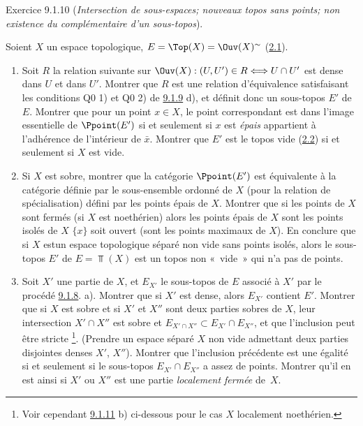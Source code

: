 \documentclass[10pt]{../fichiers-configuration-latex/smfart}
\begin{document}
\begin{enonce*}[remark]{Exercice 9.1.10}
(\emph{Intersection de sous-espaces; nouveaux topos sans points; non
existence du complémentaire d'un sous-topos}).

Soient $X$ un espace topologique, $E=\Top(X)=\Ouv(X)^{\sim}$
(\hyperref[IV.subsec2.1]{2.1}).

\begin{enumerate}
\renewcommand{\theenumi}{\alph{enumi}}
\renewcommand{\labelenumi}{\theenumi)}
\item Soit $R$ la relation suivante sur $\Ouv(X):(U,U')\in
R\Longleftrightarrow U\cap U'$ est dense dans $U$ et dans $U'$.
Montrer que $R$ est une relation d'équivalence satisfaisant les
conditions Q0 1) et Q0 2) de \hyperref[IV.exer9.1.9]{9.1.9} d), et définit donc
un sous-topos $E'$ de $E$. Montrer que pour un point $x\in X$, le
point correspondant est dans l'image essentielle de $\Ppoint(E')$ si
et seulement si $x$ est \emph{épais} \ie appartient à l'adhérence de
l'intérieur de $\bar{x}$. Montrer que $E'$ est le topos vide
(\hyperref[IV.subsec2.2]{2.2}) si et seulement si $X$ est vide.

\item Si $X$ est sobre, montrer que la catégorie $\Ppoint(E')$ est
équivalente à la catégorie définie par le sous-ensemble ordonné de
$X$ (pour la relation de spécialisation) défini par les points épais
de $X$. Montrer que si les points de $X$ sont fermés (\resp si $X$
est noethérien) alors les points épais de $X$ sont les points isolés
de $X$  $\{x\}$ soit ouvert (\resp sont les points
maximaux de $X$). En conclure que si $X$ est\pageoriginale un espace
topologique séparé non vide sans points isolés, alors le sous-topos
$E'$ de $E=\Top(X)$ est un topos non « vide »  qui n'a pas de
points.

\item Soit $X'$ une partie de $X$, et $E_{X'}$ le sous-topos de $E$
associé à $X'$ par le procédé \hyperref[IV.exer9.1.8]{9.1.8}. a). Montrer que si
$X'$ est dense, alors $E_{X'}$ contient $E'$. Montrer que si $X$ est
sobre et si $X'$ et $X''$ sont deux parties sobres de $X$, leur
intersection $X'\cap X''$ est sobre et $E_{X'\cap X''}\subset
E_{X'}\cap E_{X''}$, et que l'inclusion peut être stricte
\footnote[1]{Voir cependant \hyperref[IV.exer9.1.11]{9.1.11} b) ci-dessous pour
le cas $X$ localement noethérien.}. (Prendre un espace séparé $X$
non vide admettant deux parties disjointes denses $X'$, $X''$).
Montrer que l'inclusion précédente est une égalité si et seulement
si le sous-topos $E_{X'}\cap E_{X''}$ a assez de points. Montrer
qu'il en est ainsi si $X'$ ou $X''$ est une partie \emph{localement
fermée} de~$X$.


\end{enumerate}
\end{enonce*}
\end{document}
